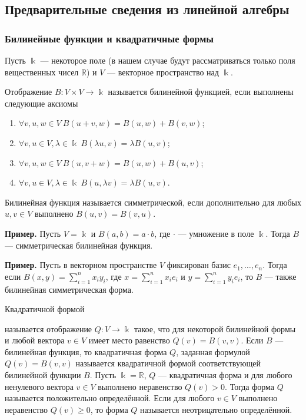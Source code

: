 \documentclass[12pt]{article}
\numberwithin{theorem}{section}
\numberwithin{proposition}{section}
\theoremstyle{definition}
\newenvironment{example}{\indent \textbf{Пример.}}{\indent}
\newcommand{\RR}{\mathbb{R}}
\newcommand{\defin}[2]{\hypertarget{#2}{{\color{red} #1}}}
\begin{document}
	\subsection{Предварительные сведения из линейной алгебры}
	
	\subsubsection{Билинейные функции и квадратичные формы}
	
	Пусть $ \Bbbk $ --- некоторое поле (в нашем случае будут рассматриваться только поля вещественных чисел $ \RR $) и $ V $ --- векторное пространство над $ \Bbbk $.
	
	Отображение $ B \colon V \times V \to \Bbbk $ называется \defin{билинейной функцией}{bilinear}, если выполнены следующие аксиомы
	\begin{enumerate}
		\item $ \forall v,u,w \in V \ B(u + v, w) = B(u, w) + B(v, w) $;
		\item $ \forall v,u \in V, \lambda \in \Bbbk \ B(\lambda u, v) = \lambda B(u, v) $;
		\item $ \forall v,u,w \in V \ B(u, v + w) = B(u, w) + B(u, v) $;
		\item $ \forall v,u \in V, \lambda \in \Bbbk \ B(u, \lambda v) = \lambda B(u, v) $.
	\end{enumerate}
	
	Билинейная функция называется \defin{симметрической}{symmetric}, если дополнительно для любых $ u, v \in V $ выполнено $ B(u, v) = B(v, u) $.
	
	\begin{example}
		Пусть $ V = \Bbbk $ и $ B(a, b) = a \cdot b $, где $ \cdot $ --- умножение в поле $ \Bbbk $.
		Тогда $ B $ --- симметрическая билинейная функция.
	\end{example}
	
	\begin{example}
		Пусть в векторном пространстве $ V $
		фиксирован базис $ e_1, \ldots, e_n $. Тогда если $ B(x, y) = \sum\limits_{i = 1}^{n} x_iy_i $, где $ x = \sum\limits_{i = 1}^{n} x_ie_i $ и $ y = \sum\limits_{i = 1}^{n} y_ie_i $, то $ B $ --- также билинейная симметрическая форма.
	\end{example}
	
	\defin{Квадратичной формой}{quadratic} называется отображение $ Q \colon V \to \Bbbk $ такое, что для некоторой билинейной формы и любой вектора $ v \in V $ имеет место равенство $ Q(v) = B(v, v) $.
	Если $ B $ --- билинейная функция, то квадратичная форма $ Q $, заданная формулой $ Q(v) = B(v, v) $
	называется квадратичной формой соответствующей билинейной функции $ B $.
	Пусть $ \Bbbk = \RR $, $ Q $ --- квадратичная форма 
	и для любого ненулевого вектора $ v \in V $ выполнено неравенство $ Q(v) > 0 $.
	Тогда форма $ Q $ называется положительно определённой. 
	Если для любого $ v \in V $ выполнено неравенство $ Q(v) \geqslant 0 $,
	то форма $ Q $ называется неотрицательно определённой.
\end{document}
